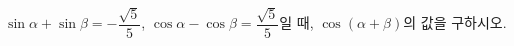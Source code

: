 $\sin\alpha+\sin\beta=-\dfrac{\sqrt{5}}{5}$, $\cos\alpha-\cos\beta=\dfrac{\sqrt{5}}{5}$일 때, $\cos(\alpha+\beta)$의 값을 구하시오.
